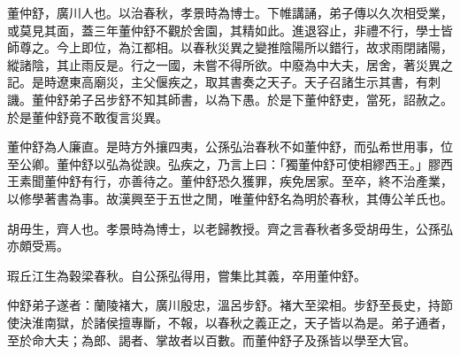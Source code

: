 \begin{pinyinscope}
董仲舒，廣川人也。以治春秋，孝景時為博士。下帷講誦，弟子傳以久次相受業，或莫見其面，蓋三年董仲舒不觀於舍園，其精如此。進退容止，非禮不行，學士皆師尊之。今上即位，為江都相。以春秋災異之變推陰陽所以錯行，故求雨閉諸陽，縱諸陰，其止雨反是。行之一國，未嘗不得所欲。中廢為中大夫，居舍，著災異之記。是時遼東高廟災，主父偃疾之，取其書奏之天子。天子召諸生示其書，有刺譏。董仲舒弟子呂步舒不知其師書，以為下愚。於是下董仲舒吏，當死，詔赦之。於是董仲舒竟不敢復言災異。

董仲舒為人廉直。是時方外攘四夷，公孫弘治春秋不如董仲舒，而弘希世用事，位至公卿。董仲舒以弘為從諛。弘疾之，乃言上曰：「獨董仲舒可使相繆西王。」膠西王素聞董仲舒有行，亦善待之。董仲舒恐久獲罪，疾免居家。至卒，終不治產業，以修學著書為事。故漢興至于五世之閒，唯董仲舒名為明於春秋，其傳公羊氏也。

胡毋生，齊人也。孝景時為博士，以老歸教授。齊之言春秋者多受胡毋生，公孫弘亦頗受焉。

瑕丘江生為穀梁春秋。自公孫弘得用，嘗集比其義，卒用董仲舒。

仲舒弟子遂者：蘭陵褚大，廣川殷忠，溫呂步舒。褚大至梁相。步舒至長史，持節使決淮南獄，於諸侯擅專斷，不報，以春秋之義正之，天子皆以為是。弟子通者，至於命大夫；為郎、謁者、掌故者以百數。而董仲舒子及孫皆以學至大官。


\end{pinyinscope}